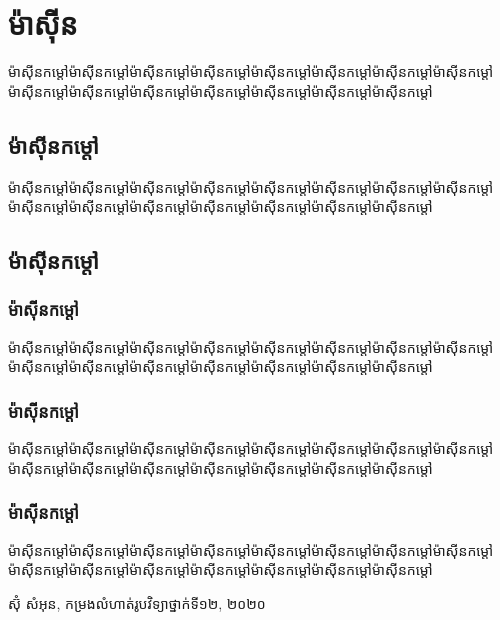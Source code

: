 \documentclass[11pt,a5paper]{classes/fancy}
\begin{document}
    \chapter{ម៉ាស៊ីន}
    \begin{biography}
    	ម៉ាស៊ីនកម្តៅម៉ាស៊ីនកម្តៅម៉ាស៊ីនកម្តៅម៉ាស៊ីនកម្តៅម៉ាស៊ីនកម្តៅម៉ាស៊ីនកម្តៅម៉ាស៊ីនកម្តៅម៉ាស៊ីនកម្តៅម៉ាស៊ីនកម្តៅម៉ាស៊ីនកម្តៅម៉ាស៊ីនកម្តៅម៉ាស៊ីនកម្តៅម៉ាស៊ីនកម្តៅម៉ាស៊ីនកម្តៅម៉ាស៊ីនកម្តៅ
    \end{biography}
    \section{ម៉ាស៊ីនកម្តៅ}
    \begin{example}
        ម៉ាស៊ីនកម្តៅម៉ាស៊ីនកម្តៅម៉ាស៊ីនកម្តៅម៉ាស៊ីនកម្តៅម៉ាស៊ីនកម្តៅម៉ាស៊ីនកម្តៅម៉ាស៊ីនកម្តៅម៉ាស៊ីនកម្តៅម៉ាស៊ីនកម្តៅម៉ាស៊ីនកម្តៅម៉ាស៊ីនកម្តៅម៉ាស៊ីនកម្តៅម៉ាស៊ីនកម្តៅម៉ាស៊ីនកម្តៅម៉ាស៊ីនកម្តៅ
    \end{example}
    \section{ម៉ាស៊ីនកម្តៅ}
    \subsection{ម៉ាស៊ីនកម្តៅ}
    \begin{remark}
        ម៉ាស៊ីនកម្តៅម៉ាស៊ីនកម្តៅម៉ាស៊ីនកម្តៅម៉ាស៊ីនកម្តៅម៉ាស៊ីនកម្តៅម៉ាស៊ីនកម្តៅម៉ាស៊ីនកម្តៅម៉ាស៊ីនកម្តៅម៉ាស៊ីនកម្តៅម៉ាស៊ីនកម្តៅម៉ាស៊ីនកម្តៅម៉ាស៊ីនកម្តៅម៉ាស៊ីនកម្តៅម៉ាស៊ីនកម្តៅម៉ាស៊ីនកម្តៅ
    \end{remark}
    \subsection{ម៉ាស៊ីនកម្តៅ}
    \begin{definition}
        ម៉ាស៊ីនកម្តៅម៉ាស៊ីនកម្តៅម៉ាស៊ីនកម្តៅម៉ាស៊ីនកម្តៅម៉ាស៊ីនកម្តៅម៉ាស៊ីនកម្តៅម៉ាស៊ីនកម្តៅម៉ាស៊ីនកម្តៅម៉ាស៊ីនកម្តៅម៉ាស៊ីនកម្តៅម៉ាស៊ីនកម្តៅម៉ាស៊ីនកម្តៅម៉ាស៊ីនកម្តៅម៉ាស៊ីនកម្តៅម៉ាស៊ីនកម្តៅ
    \end{definition}
    \subsection{ម៉ាស៊ីនកម្តៅ}
    \begin{theorem}
       	ម៉ាស៊ីនកម្តៅម៉ាស៊ីនកម្តៅម៉ាស៊ីនកម្តៅម៉ាស៊ីនកម្តៅម៉ាស៊ីនកម្តៅម៉ាស៊ីនកម្តៅម៉ាស៊ីនកម្តៅម៉ាស៊ីនកម្តៅម៉ាស៊ីនកម្តៅម៉ាស៊ីនកម្តៅម៉ាស៊ីនកម្តៅម៉ាស៊ីនកម្តៅម៉ាស៊ីនកម្តៅម៉ាស៊ីនកម្តៅម៉ាស៊ីនកម្តៅ
    \end{theorem}
    \backmatter
    \begin{thebibliography}{9}
        ស៊ុំ សំអុន, កម្រងលំហាត់រូបវិទ្យាថ្នាក់ទី១២, ២០២០
    \end{thebibliography}
\end{document}
